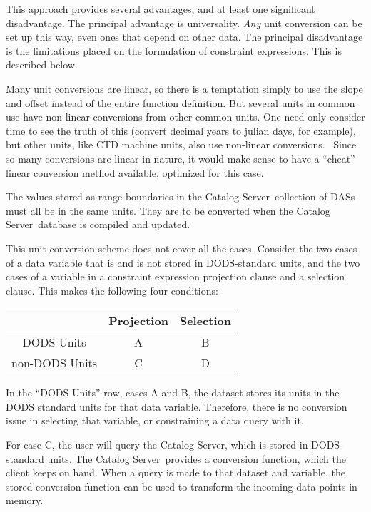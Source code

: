 \documentclass[10pt]{report}
\newcommand{\cs}{Catalog Server}
\begin{document}
This approach provides several advantages, and at least one
significant disadvantage.  The principal advantage is universality.
\emph{Any} unit conversion can be set up this way, even ones that
depend on other data.  The principal disadvantage is the limitations
placed on the formulation of constraint expressions.  This is
described below.

Many unit conversions are linear, so there is a temptation simply to
use the slope and offset instead of the entire function definition.
But several units in common use have non-linear conversions from other
common units.  One need only consider time to see the truth of this
(convert decimal years to julian days, for example), but other units,
like CTD machine units, also use non-linear conversions. \cbstart\
Since so many conversions are linear in nature, it would make sense to
have a ``cheat'' linear conversion method available, optimized for
this case.\cbend

The values stored as range boundaries in the \cs\ collection of DASs
must all be in the same units.  They are to be converted when the \cs\
database is compiled and updated.

This unit conversion scheme does not cover all the cases. Consider the
two cases of a data variable that is and is not stored in
DODS-standard units, and the two cases of a variable in a constraint
expression projection clause and a selection clause.  This makes the 
following four conditions:

\begin{center} 
\begin{tabular}{| c || c | c |} \hline 
 & Projection  & Selection \\ \hline \hline
DODS Units & A & B \\ 
non-DODS Units & C & D \\ \hline
\end{tabular} 
\end{center} 

In the ``DODS Units'' row, cases A and B, the dataset stores its units
in the DODS standard units for that data variable.  Therefore, there
is no conversion issue in selecting that variable, or constraining a
data query with it.  

For case C, the user will query the \cs , which is stored in
DODS-standard units.  The \cs\ provides a conversion function, which
the client keeps on hand.  When a query is made to that dataset and
variable, the stored conversion function can be used to transform the
incoming data points in memory.
\end{document}
